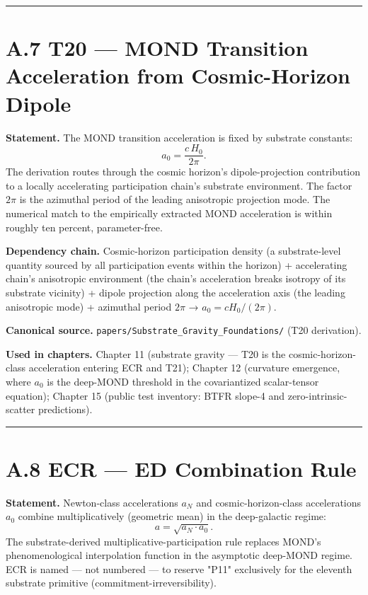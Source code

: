 \documentclass[11pt]{book}
\begin{document}
\bigskip\hrule\bigskip

\section{A.7 T20 — MOND Transition Acceleration from Cosmic-Horizon Dipole}

\textbf{Statement.} The MOND transition acceleration is fixed by substrate constants:
\[
a_0 = \frac{c\,H_0}{2\pi}.
\]
The derivation routes through the cosmic horizon's dipole-projection contribution to a locally accelerating participation chain's substrate environment. The factor $2\pi$ is the azimuthal period of the leading anisotropic projection mode. The numerical match to the empirically extracted MOND acceleration is within roughly ten percent, parameter-free.

\textbf{Dependency chain.} Cosmic-horizon participation density (a substrate-level quantity sourced by all participation events within the horizon) + accelerating chain's anisotropic environment (the chain's acceleration breaks isotropy of its substrate vicinity) + dipole projection along the acceleration axis (the leading anisotropic mode) + azimuthal period $2\pi$ → $a_0 = cH_0/(2\pi)$.

\textbf{Canonical source.} \texttt{papers/Substrate\_Gravity\_Foundations/} (T20 derivation).

\textbf{Used in chapters.} Chapter 11 (substrate gravity — T20 is the cosmic-horizon-class acceleration entering ECR and T21); Chapter 12 (curvature emergence, where $a_0$ is the deep-MOND threshold in the covariantized scalar-tensor equation); Chapter 15 (public test inventory: BTFR slope-4 and zero-intrinsic-scatter predictions).

\bigskip\hrule\bigskip

\section{A.8 ECR — ED Combination Rule}

\textbf{Statement.} Newton-class accelerations $a_N$ and cosmic-horizon-class accelerations $a_0$ combine multiplicatively (geometric mean) in the deep-galactic regime:
\[
a = \sqrt{a_N \cdot a_0}.
\]
The substrate-derived multiplicative-participation rule replaces MOND's phenomenological interpolation function in the asymptotic deep-MOND regime. ECR is named — not numbered — to reserve "P11" exclusively for the eleventh substrate primitive (commitment-irreversibility).
\end{document}
